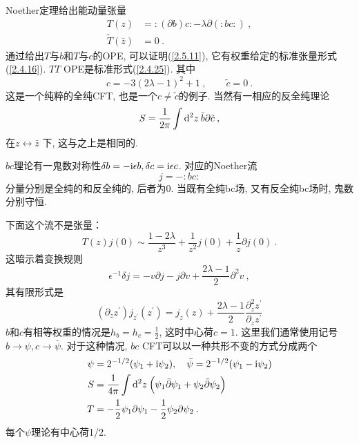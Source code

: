 Noether定理给出能动量张量
\begin{subequations}\label{2.5.11}
\begin{align}
T(z)&=:\mathrel{(\partial b) c}:-\lambda \partial(: \mathrel{b c}:)  \:,  \label{2.5.11a}\\
\tilde{T}(\bar{z})&=0  \:. \label{2.5.11b}
\end{align}
\end{subequations}
通过给出$T$与$b$和$T$与$c$的OPE, 可以证明(\ref{2.5.11}), 它有权重给定的标准张量形式(\ref{2.4.16}). $TT$ OPE是标准形式(\ref{2.4.25}). 其中
\begin{equation}
c=-3(2 \lambda-1)^{2}+1\:, \qquad \tilde{c}=0 \:. \label{2.5.12}
\end{equation}
这是一个纯粹的全纯CFT, 也是一个$c \neq \tilde{c}$的例子. 当然有一相应的反全纯理论
\begin{equation}
S=\frac{1}{2 \pi} \int \mathrm{d}^{2} z \: \tilde{b} \partial \tilde{c} \:,
\end{equation}
在$z \leftrightarrow \bar{z}$ 下, 这与之上是相同的.

$bc$理论有一鬼数对称性$\delta b=-\mathrm{i} \epsilon b, \delta c=\mathrm{i} \epsilon c$. 对应的Noether流
\begin{equation}\label{2.5.14}
j=-:\mathrel{b c}:
\end{equation}
分量分别是全纯的和反全纯的, 后者为0. 当既有全纯bc场, 又有反全纯bc场时, 鬼数分别守恒. 

下面这个流不是张量：
\begin{equation}
T(z) j(0) \sim \frac{1-2 \lambda}{z^{3}}+\frac{1}{z^{2}} j(0)+\frac{1}{z} \partial j(0) \:. \label{2.5.15}
\end{equation}
这暗示着变换规则
\begin{equation} \label{2.5.16}
\epsilon^{-1} \delta j=-v \partial j-j \partial v+\frac{2 \lambda-1}{2} \partial^{2} v \:,
\end{equation}
其有限形式是
\begin{equation}\label{2.5.17}
(\partial_{z} z^{\prime}) j_{z^{\prime}}(z^{\prime})=j_{z}(z)+\frac{2 \lambda-1}{2} \frac{\partial_{z}^{2} z^{\prime}}{\partial_{z} z^{\prime}}
\end{equation}
$b$和$c$有相等权重的情况是$h_{b}=h_{c}=\frac{1}{2}$, 这时中心荷$c=1$. 这里我们通常使用记号$b\to \psi,c \to  \bar{\psi}$. 对于这种情况, 
$bc$ CFT可以以一种共形不变的方式分成两个
\begin{subequations} \label{2.5.18}
\begin{align}
\psi&=2^{-1 / 2}(\psi_{1}+ \mathrm{i} \psi_{2}), \quad \bar{\psi}=2^{-1 / 2}(\psi_{1}- \mathrm{i} \psi_{2})  \label{2.5.18a}\\
S&=\frac{1}{4 \pi} \int \mathrm{d}^{2} z\:\Bigl(\psi_{1} \bar{\partial} \psi_{1}+\psi_{2} \bar{\partial} \psi_{2}\Bigr) \label{2.5.18b}\\
T&=-\frac{1}{2} \psi_{1} \partial \psi_{1}-\frac{1}{2} \psi_{2} \partial \psi_{2} \:. \label{2.5.18c}
\end{align}
\end{subequations}
每个$\psi$理论有中心荷1/2. 

